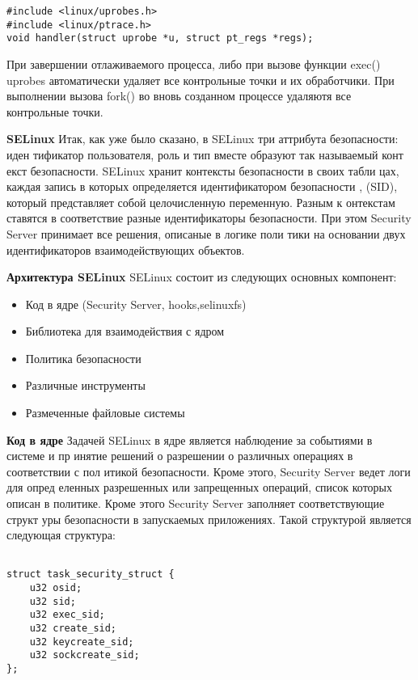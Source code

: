 \begin{lstlisting}
#include <linux/uprobes.h>
#include <linux/ptrace.h>
void handler(struct uprobe *u, struct pt_regs *regs);
\end{lstlisting}

\bigskip
При завершении отлаживаемого процесса, либо при вызове функции exec() 
uprobes автоматически удаляет все контрольные точки и их обработчики. 
При выполнении вызова fork() во вновь созданном процессе удаляютя все 
контрольные точки. 


\bigskip 
{\bfseries SELinux}
Итак, как уже было сказано, в SELinux три аттрибута безопасности: иден
тификатор пользователя, роль и тип вместе образуют так называемый конт
екст безопасности. SELinux хранит контексты безопасности в своих табли
цах, каждая запись в которых определяется идентификатором безопасности
, (SID), который представляет собой целочисленную переменную. Разным к
онтекстам ставятся в соответствие разные идентификаторы безопасности. 
При этом Security Server принимает все решения, описаные в логике поли
тики на основании двух идентификаторов взаимодействующих объектов. 

\bigskip
{\bfseries Архитектура SELinux}
SELinux состоит из следующих основных компонент:
\begin{itemize}
\item Код в ядре (Security Server, hooks,selinuxfs)
\item Библиотека для взаимодействия с ядром
\item Политика безопасности
\item Различные инструменты
\item Размеченные файловые системы
\end{itemize}

\bigskip
{\bfseries Код в ядре}
Задачей SELinux в ядре является наблюдение за событиями в системе и пр
инятие решений о разрешении о различных операциях в соответствии с пол
итикой безопасности. Кроме этого, Security Server ведет логи для опред
еленных разрешенных или запрещенных операций, список которых описан в 
политике. Кроме этого Security Server заполняет соответствующие структ
уры безопасности в запускаемых приложениях. Такой структурой является 
следующая структура: 

\bigskip 
\begin{lstlisting}
	
struct task_security_struct {
	u32 osid;		
	u32 sid;	
	u32 exec_sid;		
	u32 create_sid;		
	u32 keycreate_sid;	
	u32 sockcreate_sid;	
};

\end{lstlisting}

